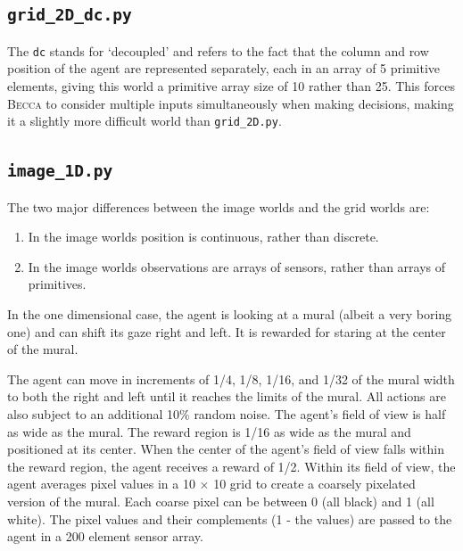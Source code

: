 \subsection{\texttt{grid\_2D\_dc.py}}

The \texttt{dc} stands for `decoupled' and refers to the fact that the column and row position of the agent are represented separately, each in an array of 5 primitive elements, giving this world a primitive array size of 10 rather than 25. This forces \textsc{Becca} to consider multiple inputs simultaneously when making decisions, making it a slightly more difficult world than \texttt{grid\_2D.py}.

\subsection{\texttt{image\_1D.py}}

The two major differences between the image worlds and the grid worlds are:

\begin{enumerate}
\item In the image worlds position is continuous, rather than discrete.
\item In the image worlds observations are arrays of sensors, rather than arrays of primitives.
\end{enumerate}

In the one dimensional case, the agent is looking at a mural (albeit a very boring one) and can shift its gaze right and left. It is rewarded for staring at the center of the mural.

The agent can move in increments of 1/4, 1/8, 1/16, and 1/32 of the mural width to both the right and left until it reaches the limits of the mural. All actions are also subject to an additional 10\% random noise. The agent's field of view is half as wide as the mural. The reward region is 1/16 as wide as the mural and positioned at its center. When the center of the agent's field of view falls within the reward region, the agent receives a reward of 1/2. Within its field of view, the agent averages pixel values in a 10 $\times$ 10 grid to create a coarsely pixelated version of the mural. Each coarse pixel can be between 0 (all black) and 1 (all white). The pixel values and their complements (1 - the values) are passed to the agent in a 200 element sensor array.

